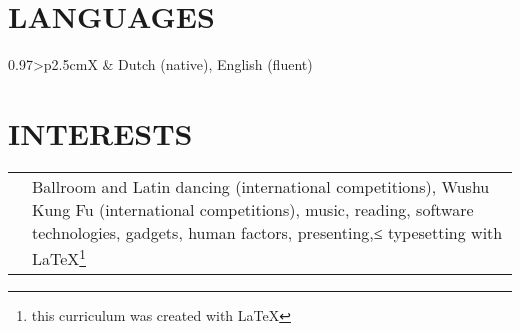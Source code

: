 \documentclass[a4paper, article, 10pt]{memoir}                                  %
\newcommand{\heading}[2]{                                                       %
    \section{
        {\fontsize{18}{\lineskip}\textbf{#1}}{\fontsize{12}{\lineskip}\textbf{#2}}}
        }
\begin{document}
    
    \heading{L}{ANGUAGES}
    \begin{tabularx}{0.97\linewidth}{>{\raggedleft\scshape}p{2.5cm}X}
          & Dutch (native), English (fluent)
    \end{tabularx}
    
    
    \heading{I}{NTERESTS}
    \begin{tabularx}{0.97\linewidth}{>{\raggedleft\scshape}p{2.5cm}X}
          & Ballroom and Latin dancing (international competitions), Wushu Kung Fu (international competitions), music, reading, software technologies, gadgets, human factors, presenting,≤ typesetting with \LaTeX\footnote{this curriculum was created with \LaTeX}
    \end{tabularx}
    
\end{document}
